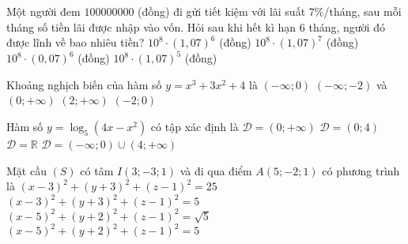 \begin{ex}%
Một người đem $100000000$ (đồng) đi gửi tiết kiệm với lãi suất $7\%$/tháng, sau mỗi tháng số tiền lãi được nhập vào vốn. Hỏi sau khi hết kì hạn $6$ tháng, người đó được lĩnh về bao nhiêu tiền?
\choice
{\True $10^{8}\cdot (1{,}07)^6$ (đồng)}
{$10^{8}\cdot (1{,}07)^7$ (đồng)}
{$10^{8}\cdot (0{,}07)^6$ (đồng)}
{$10^{8}\cdot (1{,}07)^5$ (đồng)} 
\end{ex}

\begin{ex}%
Khoảng nghịch biến của hàm số $y=x^3+3x^2+4$ là
\choice
{$(-\infty; 0)$}
{$(-\infty;-2)$ và $(0;+\infty )$}
{$(2;+\infty )$}
{\True $(-2;0)$} 
\end{ex}

\begin{ex}%
Hàm số $y=\log_5 (4x-x^2)$ có tập xác định là 
\choice
{$\mathscr{D}=(0;+\infty)$}
{\True $\mathscr{D}=(0;4)$}
{$\mathscr{D}=\mathbb{R}$}
{$\mathscr{D}=(-\infty;0)\cup (4;+\infty)$} 
\end{ex}

\begin{ex}%
Mặt cầu $(S)$ có tâm $I(3;-3;1)$ và đi qua điểm $A(5;-2;1)$ có phương trình là 
\choice
{$(x-3)^2+(y+3)^2+(z-1)^2=25$}
{\True $(x-3)^2+(y+3)^2+(z-1)^2=5$}
{$(x-5)^2+(y+2)^2+(z-1)^2=\sqrt{5}$}
{$(x-5)^2+(y+2)^2+(z-1)^2=5$} 
\end{ex}


